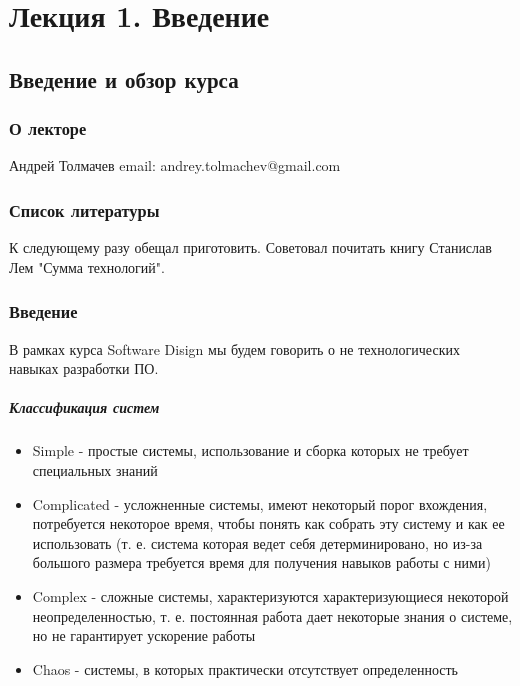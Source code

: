 \chapter{Лекция 1. Введение}

\section{Введение и обзор курса}

\subsection{О лекторе}

Андрей Толмачев email: andrey.tolmachev@gmail.com

\subsection{Список литературы}

К следующему разу обещал приготовить. Советовал почитать книгу Станислав Лем "Сумма технологий".

\subsection{Введение}

В рамках курса Software Disign мы будем говорить о не технологических навыках разработки ПО.

\paragraph{Классификация систем}

\begin{itemize}
\item Simple - простые системы, использование и сборка которых не требует специальных знаний

\item Complicated - усложненные системы, имеют некоторый порог вхождения, потребуется некоторое время, чтобы понять как собрать эту систему и как ее использовать
(т. е. система которая ведет себя детерминировано, но из-за большого размера требуется время для получения навыков работы с ними)

\item Complex - сложные системы, характеризуются характеризующиеся некоторой неопределенностью, т. е. постоянная работа дает некоторые знания о системе, но не
гарантирует ускорение работы

\item Chaos - системы, в которых практически отсутствует определенность
\end{itemize}

